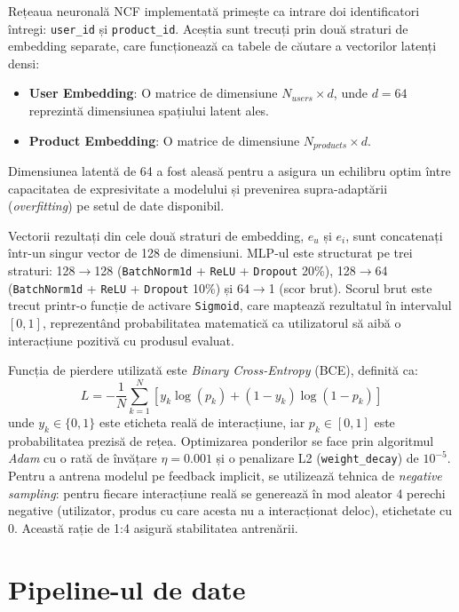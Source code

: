 Rețeaua neuronală NCF implementată primește ca intrare doi identificatori întregi: \texttt{user\_id} și \texttt{product\_id}. Aceștia sunt trecuți prin două straturi de embedding separate, care funcționează ca tabele de căutare a vectorilor latenți densi:
\begin{itemize}
    \item \textbf{User Embedding}: O matrice de dimensiune $N_{users} \times d$, unde $d = 64$ reprezintă dimensiunea spațiului latent ales.
    \item \textbf{Product Embedding}: O matrice de dimensiune $N_{products} \times d$.
\end{itemize}
Dimensiunea latentă de 64 a fost aleasă pentru a asigura un echilibru optim între capacitatea de expresivitate a modelului și prevenirea supra-adaptării (\textit{overfitting}) pe setul de date disponibil.

Vectorii rezultați din cele două straturi de embedding, $e_u$ și $e_i$, sunt concatenați într-un singur vector de 128 de dimensiuni. MLP-ul este structurat pe trei straturi: 128$\rightarrow$128 (\texttt{BatchNorm1d} + \texttt{ReLU} + \texttt{Dropout} 20\%), 128$\rightarrow$64 (\texttt{BatchNorm1d} + \texttt{ReLU} + \texttt{Dropout} 10\%) și 64$\rightarrow$1 (scor brut). Scorul brut este trecut printr-o funcție de activare \texttt{Sigmoid}, care maptează rezultatul în intervalul $[0, 1]$, reprezentând probabilitatea matematică ca utilizatorul să aibă o interacțiune pozitivă cu produsul evaluat.

Funcția de pierdere utilizată este \textit{Binary Cross-Entropy} (BCE), definită ca:
\begin{equation}
L = - \frac{1}{N} \sum_{k=1}^{N} \left[ y_k \log(p_k) + (1 - y_k) \log(1 - p_k) \right]
\end{equation}
unde $y_k \in \{0, 1\}$ este eticheta reală de interacțiune, iar $p_k \in [0, 1]$ este probabilitatea prezisă de rețea. Optimizarea ponderilor se face prin algoritmul \textit{Adam} cu o rată de învățare $\eta = 0.001$ și o penalizare L2 (\texttt{weight\_decay}) de $10^{-5}$. Pentru a antrena modelul pe feedback implicit, se utilizează tehnica de \textit{negative sampling}: pentru fiecare interacțiune reală se generează în mod aleator 4 perechi negative (utilizator, produs cu care acesta nu a interacționat deloc), etichetate cu 0. Această rație de 1:4 asigură stabilitatea antrenării.

\section{Pipeline-ul de date}

